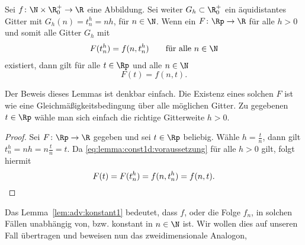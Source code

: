 \begin{lemma} \label{lem:adv:konstant1}
Sei $f\colon \N \times \R^+_0 \to \R$ eine Abbildung.
Sei weiter $G_h \subset \R^+_0$ ein äquidistantes Gitter mit $G_h(n) = t^h_n = n h$, für $n \in \N$.
Wenn ein $F\colon \Rp \to \R$ für alle $h > 0$ und somit alle Gitter $G_h$ mit
\begin{align}\label{eq:lemma:const1d:voraussetzung}
F(t^h_n) = f(n, t^h_n) \qquad \text{für alle $n \in \N$}
\end{align}
existiert, dann gilt für alle $t \in \Rp$ und alle $n \in \N$
\[ F(t) = f(n, t). \]
\end{lemma}
Der Beweis dieses Lemmas ist denkbar einfach. Die Existenz eines solchen $F$ ist wie eine Gleichmäßigkeitsbedingung über alle möglichen Gitter.
Zu gegebenen $t \in \Rp$ wähle man sich einfach die richtige Gitterweite $h > 0$.
\begin{proof}
Sei $F\colon \Rp \to \R$ gegeben und sei $t \in \Rp$ beliebig.
Wähle $h = \frac{t}{n}$, dann gilt $t^h_n = nh = n \frac{t}{n} = t$.
Da \eqref{eq:lemma:const1d:voraussetzung} für alle $h > 0$ gilt, folgt hiermit 
\[ F(t) = F(t^h_n) = f(n, t^h_n) = f(n, t). \qedhere \]
\end{proof}

Das Lemma~\ref{lem:adv:konstant1} bedeutet, dass $f$, oder die Folge $f_n$, in solchen Fällen unabhängig von, bzw. konstant in $n \in \N$ ist.
Wir wollen dies auf unseren Fall übertragen und beweisen nun das zweidimensionale Analogon, 

